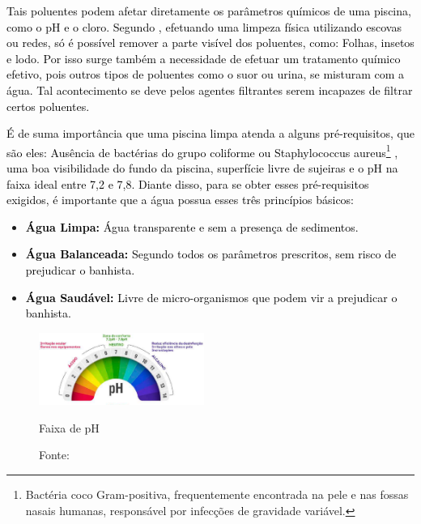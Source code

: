        \textcolor{black}{Tais poluentes podem afetar diretamente os parâmetros químicos de uma piscina, como o pH e o cloro. Segundo \cite{guiaTratamento}, efetuando uma limpeza física utilizando escovas ou redes, só é possível remover a parte visível dos poluentes, como: Folhas, insetos e lodo. Por isso surge também a necessidade de efetuar um tratamento químico efetivo, pois outros tipos de poluentes como o suor ou urina, se misturam com a água. Tal acontecimento se deve pelos agentes filtrantes serem incapazes de filtrar certos poluentes.}


       \textcolor{black}{É de suma importância que uma piscina limpa atenda a alguns pré-requisitos, que são eles: Ausência de bactérias do grupo coliforme ou Staphylococcus aureus\footnote{Bactéria coco Gram-positiva, frequentemente encontrada na pele e nas fossas nasais humanas, responsável por infecções de gravidade variável.} , uma boa visibilidade do fundo da piscina, superfície livre de sujeiras e o pH na faixa ideal entre 7,2 e 7,8. Diante disso, para se obter esses pré-requisitos exigidos, é importante que a água possua esses três princípios básicos:}
    
       \begin{itemize}
            \item \textbf{\textcolor{black}{Água Limpa:}} \textcolor{black}{Água transparente e sem a presença de sedimentos.}
            
            \item \textbf{\textcolor{black}{Água Balanceada:}} \textcolor{black}{Segundo todos os parâmetros prescritos, sem risco de prejudicar o banhista.}
             
            \item \textbf{\textcolor{black}{Água Saudável:}} \textcolor{black}{Livre de micro-organismos que podem vir a prejudicar o banhista.}
            
        \end{itemize}

        \begin{figure}[H]
                \centering
                \caption{ }  
            	\centering
                \label{fig:cont}
            	\includegraphics[width=0.48\textwidth]{imagens/medidorPh.png}
                \caption*{Faixa de pH}
            	\caption*{Fonte: \cite{guiaTratamento}}
        \end{figure}



